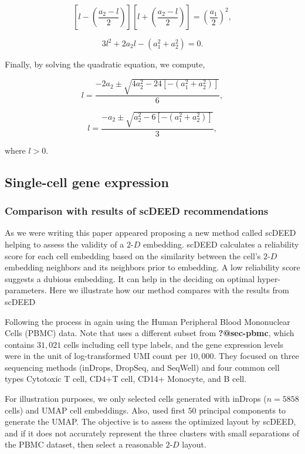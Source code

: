 \documentclass[
  12pt]{article}
\newcommand\gD{$2\text{-}D$}
\begin{document}
\[
\left[l - \left(\frac{a_2 - l}{2}\right)\right]\left[l + \left(\frac{a_2 - l}{2}\right)\right] = \left(\frac{a_1}{2}\right)^2,
\]

\[
3l^2 + 2a_2l - (a_1^2 + a_2^2) = 0.
\]

Finally, by solving the quadratic equation, we compute,

\[
l = \frac{-2a_2 \pm \sqrt{4a_2^2 - 24[-(a_1^2 + a_2^2)]}}{6},
\]

\[
l = \frac{-a_2 \pm \sqrt{a_2^2 - 6[-(a_1^2 + a_2^2)]}}{3},
\]

where \(l > 0\).

\subsection{Single-cell gene
expression}\label{single-cell-gene-expression}

\subsubsection{Comparison with results of scDEED
recommendations}\label{comparison-with-results-of-scdeed-recommendations}

As we were writing this paper \citet{xia2023} appeared proposing a new
method called scDEED helping to assess the validity of a \gD{}
embedding. scDEED calculates a reliability score for each cell embedding
based on the similarity between the cell's \gD{} embedding neighbors and
its neighbors prior to embedding. A low reliability score suggests a
dubious embedding. It can help in the deciding on optimal
hyper-parameters. Here we illustrate how our method compares with the
results from scDEED

Following the process in \citet{xia2023} again using the Human
Peripheral Blood Mononuclear Cells (PBMC) data. Note that
\citet{xia2023} uses a different subset from \textbf{?@sec-pbmc}, which
contains \(31,021\) cells including cell type labels, and the gene
expression levels were in the unit of log-transformed UMI count per
\(10,000\). They focused on three sequencing methods (inDrops, DropSeq,
and SeqWell) and four common cell types Cytotoxic T cell, CD4+T cell,
CD14+ Monocyte, and B cell.

For illustration purposes, we only selected cells generated with inDrops
(\(n=5858\) cells) and UMAP cell embeddings. Also, \citet{xia2023} used
first \(50\) principal components to generate the UMAP. The objective is
to assess the optimized layout by scDEED, and if it does not accurately
represent the three clusters with small separations of the PBMC dataset,
then select a reasonable \gD{} layout.
\end{document}
